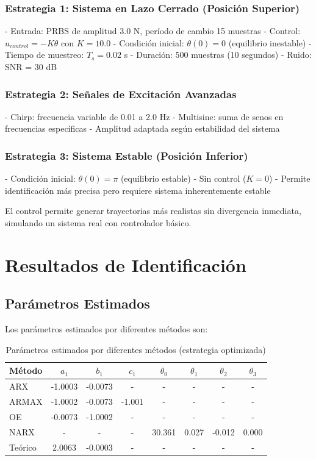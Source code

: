 \documentclass[a4paper,openright,9pt]{report}
\begin{document}
\subsubsection{Estrategia 1: Sistema en Lazo Cerrado (Posición Superior)}
- Entrada: PRBS de amplitud 3.0 N, período de cambio 15 muestras
- Control: $u_{control} = -K \theta$ con $K = 10.0$
- Condición inicial: $\theta(0) = 0$ (equilibrio inestable)
- Tiempo de muestreo: $T_s = 0.02$ s
- Duración: 500 muestras (10 segundos)
- Ruido: SNR = 30 dB

\subsubsection{Estrategia 2: Señales de Excitación Avanzadas}
- Chirp: frecuencia variable de 0.01 a 2.0 Hz
- Multisine: suma de senos en frecuencias específicas
- Amplitud adaptada según estabilidad del sistema

\subsubsection{Estrategia 3: Sistema Estable (Posición Inferior)}
- Condición inicial: $\theta(0) = \pi$ (equilibrio estable)
- Sin control ($K = 0$)
- Permite identificación más precisa pero requiere sistema inherentemente estable

El control permite generar trayectorias más realistas sin divergencia inmediata, simulando un sistema real con controlador básico.

\section{Resultados de Identificación}

\subsection{Parámetros Estimados}

Los parámetros estimados por diferentes métodos son:

\begin{table}[H]
\centering
\caption{Parámetros estimados por diferentes métodos (estrategia optimizada)}
\label{tab:parametros}
\begin{tabular}{@{}lccccccc@{}}
\toprule
Método & $a_1$ & $b_1$ & $c_1$ & $\theta_0$ & $\theta_1$ & $\theta_2$ & $\theta_3$ \\
\midrule
ARX    & -1.0003 & -0.0073 & - & - & - & - & - \\
ARMAX  & -1.0002 & -0.0073 & -1.001 & - & - & - & - \\
OE     & -0.0073 & -1.0002 & - & - & - & - & - \\
NARX   & - & - & - & 30.361 & 0.027 & -0.012 & 0.000 \\
Teórico & 2.0063 & -0.0003 & - & - & - & - & - \\
\bottomrule
\end{tabular}
\end{table}
\end{document}
